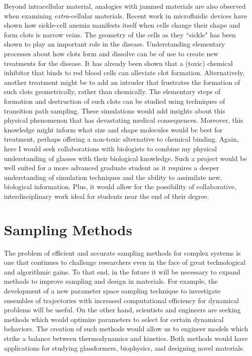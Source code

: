 \documentclass[11pt]{article}
\begin{document}
Beyond intracellular material, analogies with jammed materials are also observed when examining {\textit{ extra}}-cellular materials. Recent work in microfluidic devices have shown how sickle-cell anemia manifests itself when cells change their shape and form clots is narrow veins.  The geometry of the cells as they ``sickle" has been shown to play an important role in the disease.  Understanding elementary processes about how clots form and dissolve can be of use to create new treatments for the disease.  It has already been shown that a (toxic) chemical inhibitor that binds to red blood cells can alleviate clot formation.  %
Alternatively, another treatment might be to add an intruder that frustrates the formation of such clots geometrically, rather than chemically.  The elementary steps of formation and destruction of such clots can be studied using techniques of transition path sampling.  These simulations would add insights about this physical phenomenon that has devastating medical consequences.  Moreover, this knowledge might inform what size and shape molecules would be best for treatment, perhaps offering a non-toxic alternative to chemical binding.  Again, here I would seek collaborations with biologists to combine my physical understanding of glasses with their biological knowledge.    
Such a project would be well suited for a more advanced graduate student as it requires a deeper understanding of simulation techniques and the ability to assimilate new, biological information. Plus, it would allow for the possibility of collaborative, interdisciplinary work ideal for students near the end of their degree.

\section{Sampling Methods}

The problem of efficient and accurate sampling methods for complex systems is one that continues to challenge researchers even in the face of great technological and algorithmic gains.  To that end, in the future it will be necessary to expand methods to improve sampling and design in materials.  For example, the development of a new parameter space sampling technique to investigate ensembles of trajectories with increased computational efficiency for dynamical problems will be useful.  On the other hand, scientists and engineers are seeking methods which would optimize parameters to select for certain dynamical behaviors.  The creation of such methods would allow us to engineer models which strike a balance between thermodynamics and kinetics.  Both methods would have applications for studying glassformers, biophysics, and designing novel materials.
\end{document}
